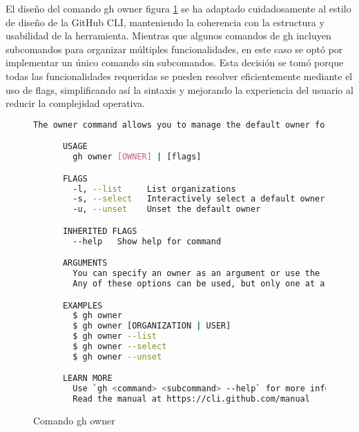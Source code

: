 El diseño del comando gh owner figura \ref{fig:ghOwner} se ha adaptado cuidadosamente al estilo de diseño de la GitHub CLI, manteniendo la coherencia con la estructura y usabilidad de la herramienta. Mientras que algunos comandos de gh incluyen subcomandos para organizar múltiples funcionalidades, en este caso se optó por implementar un único comando sin subcomandos. Esta decisión se tomó porque todas las funcionalidades requeridas se pueden resolver eficientemente mediante el uso de flags, simplificando así la sintaxis y mejorando la experiencia del usuario al reducir la complejidad operativa.

\begin{figure}[H]
  \begin{lstlisting}[language=Bash]
    The owner command allows you to manage the default owner for GitHub CLI commands.

      USAGE
        gh owner [OWNER] | [flags]

      FLAGS
        -l, --list     List organizations
        -s, --select   Interactively select a default owner
        -u, --unset    Unset the default owner

      INHERITED FLAGS
        --help   Show help for command

      ARGUMENTS
        You can specify an owner as an argument or use the --list, --select, or --unset flags.
        Any of these options can be used, but only one at a time.

      EXAMPLES
        $ gh owner
        $ gh owner [ORGANIZATION | USER]
        $ gh owner --list
        $ gh owner --select
        $ gh owner --unset

      LEARN MORE
        Use `gh <command> <subcommand> --help` for more information about a command.
        Read the manual at https://cli.github.com/manual
  \end{lstlisting}
  \caption{Comando gh owner}
  \label{fig:ghOwner}
\end{figure}